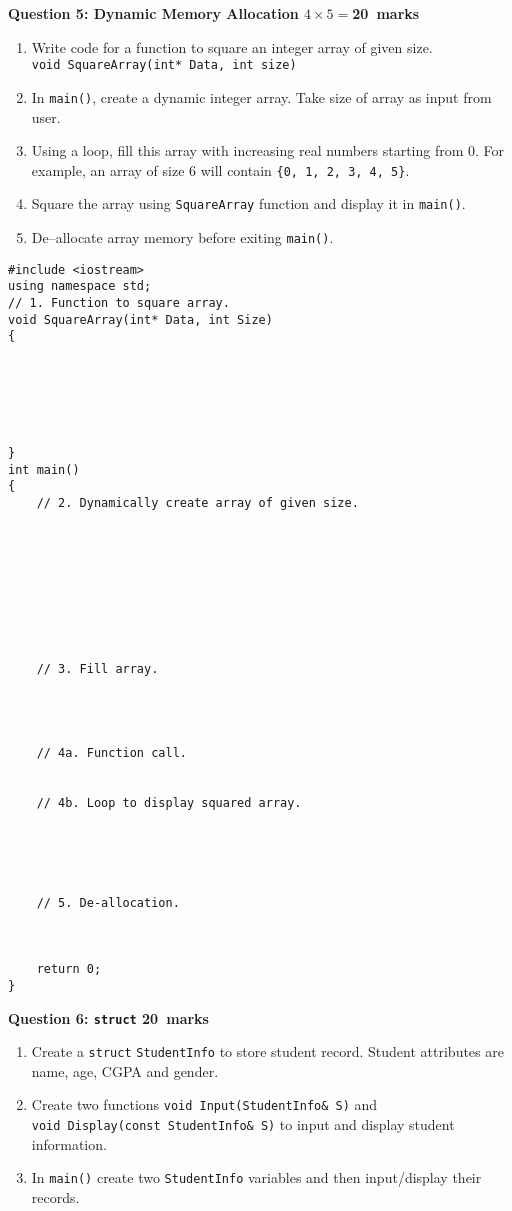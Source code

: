 \documentclass[12pt,a4paper]{article}
\def\Qfive{20}
\def\Qsix{20}
\begin{document}
\noindent\textbf{Question 5: Dynamic Memory Allocation \hfill $4\times 5=$\Qfive~marks}\\
\begin{enumerate}
\item Write code for a function to square an integer array of given size.\\
\verb|void SquareArray(int* Data, int size)|
\item In \verb|main()|, create a dynamic integer array. Take size of array as input from user.
\item Using a loop, fill this array with increasing real numbers starting from 0. For example, an array of size 6 will contain \verb|{0, 1, 2, 3, 4, 5}|.
\item Square the array using \verb|SquareArray| function and display it in \verb|main()|.
\item De--allocate array memory before exiting \verb|main()|.
\end{enumerate}
\begin{lstlisting}
#include <iostream>
using namespace std;
// 1. Function to square array.
void SquareArray(int* Data, int Size)
{






}
int main()
{
	// 2. Dynamically create array of given size.









	// 3. Fill array.




	// 4a. Function call.


	// 4b. Loop to display squared array.





	// 5. De-allocation.



	return 0;
}
\end{lstlisting}
\noindent\textbf{Question 6: \texttt{struct} \hfill \Qsix~marks}\\
\begin{enumerate}
\item Create a \texttt{struct} \verb|StudentInfo| to store student record. Student attributes are name, age, CGPA and gender.
\item Create two functions \verb|void Input(StudentInfo& S)| and\\ \verb|void Display(const StudentInfo& S)| to input and display student information.
\item In \verb|main()| create two \verb|StudentInfo| variables and then input/display their records.
\end{enumerate}
\end{document}
